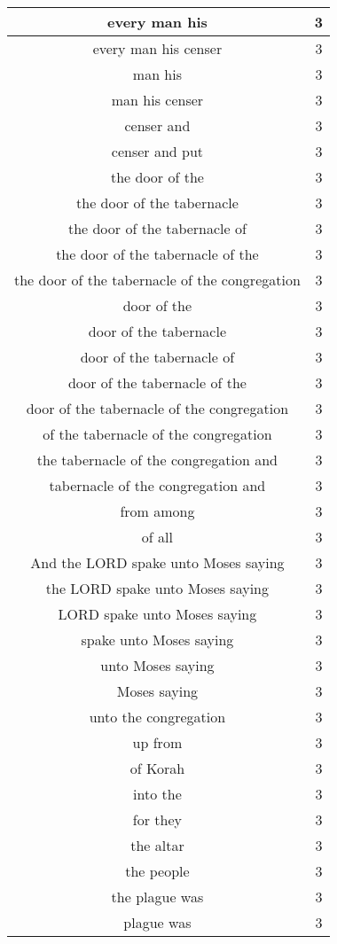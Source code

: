 \begin{center}
\begin{longtable}{|c|c|}
every man his & 3\\ \hline 
every man his censer & 3\\ \hline 
man his & 3\\ \hline 
man his censer & 3\\ \hline 
censer and & 3\\ \hline 
censer and put & 3\\ \hline 
the door of the & 3\\ \hline 
the door of the tabernacle & 3\\ \hline 
the door of the tabernacle of & 3\\ \hline 
the door of the tabernacle of the & 3\\ \hline 
the door of the tabernacle of the congregation & 3\\ \hline 
door of the & 3\\ \hline 
door of the tabernacle & 3\\ \hline 
door of the tabernacle of & 3\\ \hline 
door of the tabernacle of the & 3\\ \hline 
door of the tabernacle of the congregation & 3\\ \hline 
of the tabernacle of the congregation & 3\\ \hline 
the tabernacle of the congregation and & 3\\ \hline 
tabernacle of the congregation and & 3\\ \hline 
from among & 3\\ \hline 
of all & 3\\ \hline 
And the LORD spake unto Moses saying & 3\\ \hline 
the LORD spake unto Moses saying & 3\\ \hline 
LORD spake unto Moses saying & 3\\ \hline 
spake unto Moses saying & 3\\ \hline 
unto Moses saying & 3\\ \hline 
Moses saying & 3\\ \hline 
unto the congregation & 3\\ \hline 
up from & 3\\ \hline 
of Korah & 3\\ \hline 
into the & 3\\ \hline 
for they & 3\\ \hline 
the altar & 3\\ \hline 
the people & 3\\ \hline 
the plague was & 3\\ \hline 
plague was & 3\\ \hline 
\end{longtable}
\end{center}






